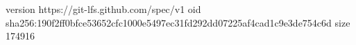 version https://git-lfs.github.com/spec/v1
oid sha256:190f2ff0bfce53652cfc1000e5497ec31fd292dd07225af4cad1c9e3de754c6d
size 174916
